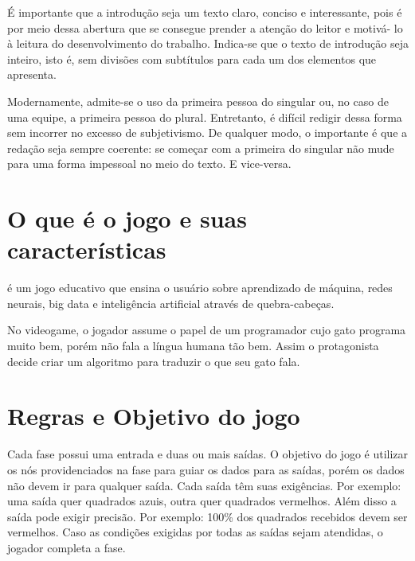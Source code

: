 \documentclass[12pt,oneside,a4paper,chapter=TITLE,section=TITLE,sumario
=tradicional]{abntex2}
\begin{document}
É importante que a introdução seja um texto claro, conciso e interessante, pois 
é por meio dessa abertura que se consegue prender a atenção do leitor e motivá- 
lo à leitura do desenvolvimento do trabalho. Indica-se que o texto de 
introdução seja inteiro, isto é, sem divisões com subtítulos para cada um dos 
elementos que apresenta.

Modernamente, admite-se o uso da primeira pessoa do singular ou, no caso de uma 
equipe, a primeira pessoa do plural. Entretanto, é difícil redigir dessa forma 
sem incorrer no excesso de subjetivismo. De qualquer modo, o importante é que a 
redação seja sempre coerente: se começar com a primeira do singular não mude 
para uma forma impessoal no meio do texto. E vice-versa.

\chapter{O que é o jogo e suas características}
\label{cap:o-que-eh-o-jogo-e-suas-caracteristicas}

 é um jogo educativo que ensina o usuário sobre aprendizado de máquina, redes neurais, big data e inteligência artificial através de quebra-cabeças.

No videogame, o jogador assume o papel de um programador cujo gato programa muito bem, porém não fala a língua humana tão bem. Assim o protagonista decide criar um algoritmo para traduzir o que seu gato fala.

\chapter{Regras e Objetivo do jogo}
\label{cap:regras-e-objetivo-do-jogo}

Cada fase possui uma entrada e duas ou mais saídas. O objetivo do jogo é utilizar os nós providenciados na fase para guiar os dados para as saídas, porém os dados não devem ir para qualquer saída. Cada saída têm suas exigências. Por exemplo: uma saída quer quadrados azuis, outra quer quadrados vermelhos. Além disso a saída pode exigir precisão. Por exemplo: 100\% dos quadrados recebidos devem ser vermelhos. Caso as condições exigidas por todas as saídas sejam atendidas, o jogador completa a fase.
\end{document}
